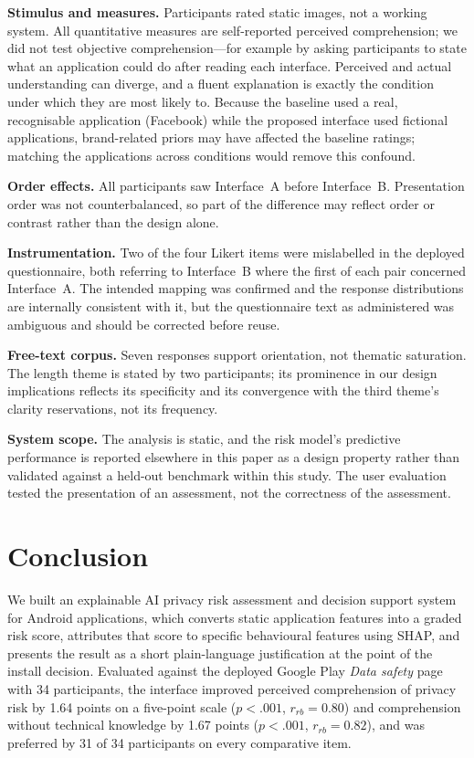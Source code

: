 \documentclass[sigconf]{acmart}
\begin{document}
\textbf{Stimulus and measures.} Participants rated static images, not a
working system. All quantitative measures are self-reported perceived
comprehension; we did not test objective comprehension---for example by
asking participants to state what an application could do after reading
each interface. Perceived and actual understanding can diverge, and a
fluent explanation is exactly the condition under which they are most
likely to. Because the baseline used a real, recognisable application
(Facebook) while the proposed interface used fictional applications,
brand-related priors may have affected the baseline ratings; matching the
applications across conditions would remove this confound.

\textbf{Order effects.} All participants saw Interface~A before
Interface~B. Presentation order was not counterbalanced, so part of the
difference may reflect order or contrast rather than the design alone.

\textbf{Instrumentation.} Two of the four Likert items were mislabelled in
the deployed questionnaire, both referring to Interface~B where the first
of each pair concerned Interface~A. The intended mapping was confirmed and
the response distributions are internally consistent with it, but the
questionnaire text as administered was ambiguous and should be corrected
before reuse.

\textbf{Free-text corpus.} Seven responses support orientation, not
thematic saturation. The length theme is stated by two participants; its
prominence in our design implications reflects its specificity and its
convergence with the third theme's clarity reservations, not its frequency.

\textbf{System scope.} The analysis is static, and the risk model's
predictive performance is reported elsewhere in this paper as a design
property rather than validated against a held-out benchmark within this
study. The user evaluation tested the presentation of an assessment, not
the correctness of the assessment.

\section{Conclusion}

We built an explainable AI privacy risk assessment and decision support
system for Android applications, which converts static application features
into a graded risk score, attributes that score to specific behavioural
features using SHAP, and presents the result as a short plain-language
justification at the point of the install decision. Evaluated against the
deployed Google Play \emph{Data safety} page with 34 participants, the
interface improved perceived comprehension of privacy risk by 1.64 points
on a five-point scale ($p<.001$, $r_{rb}=0.80$) and comprehension without
technical knowledge by 1.67 points ($p<.001$, $r_{rb}=0.82$), and was
preferred by 31 of 34 participants on every comparative item.
\end{document}
